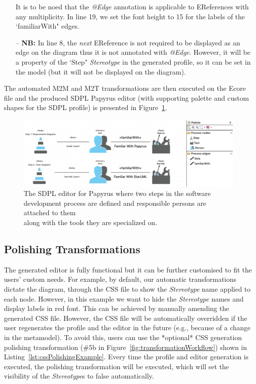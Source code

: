 \begin{itemize}
	It is to be noed that the \textit{@Edge} annotation is applicable to EReferences with any multiplicity.
	In line 19, we set the font height to 15 for the labels of the `familiarWith" edges.
	\item[--] \textbf{NB:} In line 8, the \textit{next} EReference is not required to be displayed as an edge on the diagram thus it is not annotated with \emph{@Edge}. 
	However, it will be a property of the `Step"  \textit{Stereotype} in the generated profile, so it can be set in the model (but it will not be displayed on the diagram).
\end{itemize}

The automated M2M and M2T transformations are then executed on the Ecore file and the produced SDPL Papyrus editor (with supporting palette and custom shapes for the SDPL profile) is presented in Figure~\ref{fig:sdplEditor}. 

\begin{figure}[ht!]
	\centering
	\includegraphics[width=1\textwidth]{images/sdplEditor.png}
	\caption[]{The SDPL editor for Papyrus where two steps in the software 
		development process are defined and responsible persons are attached to 
		them\\ along with the tools they are specialized on.}
	\label{fig:sdplEditor}
\end{figure}

\subsection{Polishing Transformations}
The generated editor is fully functional but it can be further customised to fit the users' custom needs. 
For example, by default, our automatic transformations dictate the diagram, through the CSS file to show the  \textit{Stereotype} name applied to each node. 
However, in this example we want to hide the \textit{Stereotype} names and display labels in red font. 
This can be achieved by manually amending the generated CSS file. 
However, the CSS file will be automatically overridden if the user regenerates the profile and the editor in the future (e.g., because of a change in the metamodel). 
To avoid this, users can use the *optional* CSS generation polishing transformation (\#5b in Figure~\ref{fig:transformationWorkflow}) shown in Listing~\ref{lst:cssPolishingExample}. 
Every time the profile and editor generation is executed, the polishing transformation will be executed, which will set the visibility of the \textit{Stereotype}s to false automatically. 

